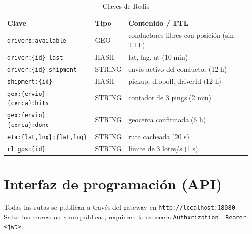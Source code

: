 \documentclass[10pt,letterpaper,twocolumn,oneside]{report}
\newcommand{\pkg}[1]{\texttt{#1}}
\begin{document}
\begin{table}[t]
\centering
\caption{Claves de Redis}
\small
\begin{tabular}{@{}L{5.2cm}L{2cm}L{7.2cm}@{}}
\toprule
\textbf{Clave} & \textbf{Tipo} & \textbf{Contenido / TTL}\\
\midrule
\pkg{drivers:available} & GEO & conductores libres con posición (sin TTL)\\
\pkg{driver:\{id\}:last} & HASH & lat, lng, at (10 min)\\
\pkg{driver:\{id\}:shipment} & STRING & envío activo del conductor (12 h)\\
\pkg{shipment:\{id\}} & HASH & pickup, dropoff, driverId (12 h)\\
\pkg{geo:\{envio\}:\{cerca\}:hits} & STRING & contador de 3 pings (2 min)\\
\pkg{geo:\{envio\}:\{cerca\}:done} & STRING & geocerca confirmada (6 h)\\
\pkg{eta:\{lat,lng\}:\{lat,lng\}} & STRING & ruta cacheada (20 s)\\
\pkg{rl:gps:\{id\}} & STRING & límite de 3 lotes/s (1 s)\\
\bottomrule
\end{tabular}
\end{table}

\chapter{Interfaz de programación (API)}

Todas las rutas se publican a través del gateway en \pkg{http://localhost:18080}. Salvo las
marcadas como públicas, requieren la cabecera \pkg{Authorization: Bearer <jwt>}.
\end{document}
